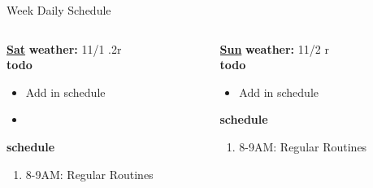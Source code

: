 \begin{columns}
\begin{column}{0.5\linewidth}
{\begin{block}{Week Daily Schedule}
\begin{columns}
          \begin{column}{0.15\textwidth}{\small \underline{\bf Sat}}
            {\small \bf weather: } 11/1 .2r \\ 
            { \small {\bf todo}} \\ 
            \begin{itemize}
              \tiny \item \tiny Add in schedule
            \item \tiny 
            \end{itemize} 
                {\small {\bf schedule}} \\
                \begin{enumerate} 
                  \tiny \item \tiny 8-9AM: Regular Routines 
                \end{enumerate}
          \end{column}
          
          \begin{column}{0.15\textwidth}{\small \underline{\bf Sun}}
            {\small \bf weather: } 11/2 r \\ 
            {\small {\bf todo}}\\ 
            \begin{itemize}
              \tiny \item \tiny Add in schedule
            \end{itemize} 
                {\small {\bf schedule}}\\
                \begin{enumerate} 
                  \tiny \item \tiny 8-9AM: Regular Routines 
                \end{enumerate}
          \end{column}

        \end{columns}
      \end{block}

}
 


\end{column}
\end{columns}
